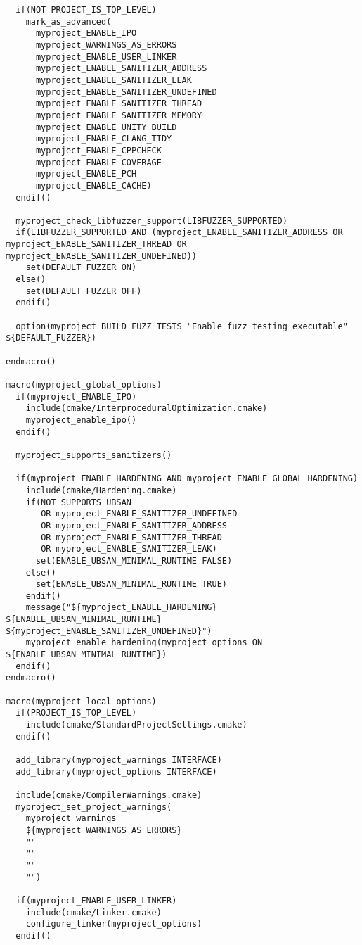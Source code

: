 \documentclass[openany]{report}
\begin{document}
\begin{verbatim}
  if(NOT PROJECT_IS_TOP_LEVEL)
    mark_as_advanced(
      myproject_ENABLE_IPO
      myproject_WARNINGS_AS_ERRORS
      myproject_ENABLE_USER_LINKER
      myproject_ENABLE_SANITIZER_ADDRESS
      myproject_ENABLE_SANITIZER_LEAK
      myproject_ENABLE_SANITIZER_UNDEFINED
      myproject_ENABLE_SANITIZER_THREAD
      myproject_ENABLE_SANITIZER_MEMORY
      myproject_ENABLE_UNITY_BUILD
      myproject_ENABLE_CLANG_TIDY
      myproject_ENABLE_CPPCHECK
      myproject_ENABLE_COVERAGE
      myproject_ENABLE_PCH
      myproject_ENABLE_CACHE)
  endif()

  myproject_check_libfuzzer_support(LIBFUZZER_SUPPORTED)
  if(LIBFUZZER_SUPPORTED AND (myproject_ENABLE_SANITIZER_ADDRESS OR myproject_ENABLE_SANITIZER_THREAD OR myproject_ENABLE_SANITIZER_UNDEFINED))
    set(DEFAULT_FUZZER ON)
  else()
    set(DEFAULT_FUZZER OFF)
  endif()

  option(myproject_BUILD_FUZZ_TESTS "Enable fuzz testing executable" ${DEFAULT_FUZZER})

endmacro()

macro(myproject_global_options)
  if(myproject_ENABLE_IPO)
    include(cmake/InterproceduralOptimization.cmake)
    myproject_enable_ipo()
  endif()

  myproject_supports_sanitizers()

  if(myproject_ENABLE_HARDENING AND myproject_ENABLE_GLOBAL_HARDENING)
    include(cmake/Hardening.cmake)
    if(NOT SUPPORTS_UBSAN 
       OR myproject_ENABLE_SANITIZER_UNDEFINED
       OR myproject_ENABLE_SANITIZER_ADDRESS
       OR myproject_ENABLE_SANITIZER_THREAD
       OR myproject_ENABLE_SANITIZER_LEAK)
      set(ENABLE_UBSAN_MINIMAL_RUNTIME FALSE)
    else()
      set(ENABLE_UBSAN_MINIMAL_RUNTIME TRUE)
    endif()
    message("${myproject_ENABLE_HARDENING} ${ENABLE_UBSAN_MINIMAL_RUNTIME} ${myproject_ENABLE_SANITIZER_UNDEFINED}")
    myproject_enable_hardening(myproject_options ON ${ENABLE_UBSAN_MINIMAL_RUNTIME})
  endif()
endmacro()

macro(myproject_local_options)
  if(PROJECT_IS_TOP_LEVEL)
    include(cmake/StandardProjectSettings.cmake)
  endif()

  add_library(myproject_warnings INTERFACE)
  add_library(myproject_options INTERFACE)

  include(cmake/CompilerWarnings.cmake)
  myproject_set_project_warnings(
    myproject_warnings
    ${myproject_WARNINGS_AS_ERRORS}
    ""
    ""
    ""
    "")

  if(myproject_ENABLE_USER_LINKER)
    include(cmake/Linker.cmake)
    configure_linker(myproject_options)
  endif()


\end{verbatim}
\end{document}
